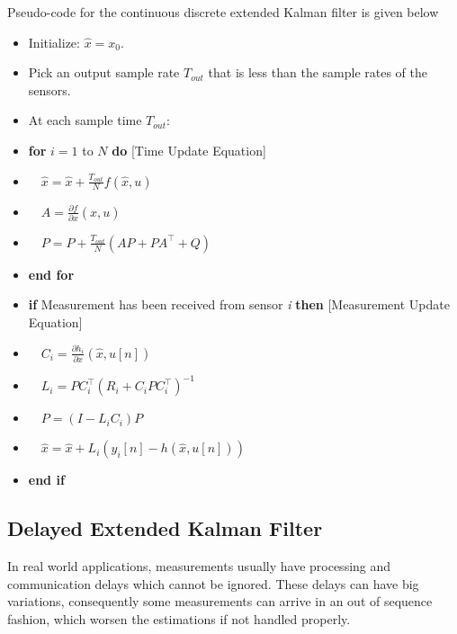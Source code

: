 Pseudo-code for the continuous discrete extended Kalman filter is given below
\renewcommand{\labelitemi}{$\cdot$}
\begin{itemize}[nosep]
\item Initialize: $ \hat{x}=x_0 $.
\item Pick an output sample rate $T_{out}$ that is less than the sample rates of the sensors.
\item At each sample time $T_{out}$:

\item \textbf{for} $ i=1 $ to $ N $ \textbf{do} [Time Update Equation]
\item $ \quad \hat{x} = \hat{x} + \frac{T_{out}}{N}f(\hat{x},u) $
\item $ \quad A = \frac{\partial f}{\partial x}(\hat{x},u)$
\item $ \quad P=P+\frac{T_{out}}{N}(AP+PA^\top+Q) $
\item \textbf{end for}
\item \textbf{if} Measurement has been received from sensor \textit{i} \textbf{then} [Measurement Update Equation]
\item $ \quad C_i=\frac{\partial h_i}{\partial x}(\hat{x},u[n])$
\item $ \quad L_i=PC_i^\top(R_i+C_i P C_i^\top)^{-1}$
\item $ \quad P=(I-L_iC_i)P$
\item $ \quad \hat{x}=\hat{x}+L_i(y_i[n]-h(\hat{x},u[n]))$
\item \textbf{end if}
\end{itemize}

\subsection{Delayed Extended Kalman Filter}{\label{sub:DEKF}}
In real world applications, measurements usually have processing and communication delays which cannot be ignored. These delays can have big variations, consequently some measurements can arrive in an out of sequence fashion, which worsen the estimations if not handled properly.

